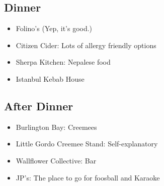 \subsection{Dinner}

\begin{itemize}
    \item Folino's (Yep, it's good.)
    \item Citizen Cider: Lots of allergy friendly options
    \item Sherpa Kitchen: Nepalese food
    \item Istanbul Kebab House
\end{itemize}

\subsection{After Dinner}

\begin{itemize}
    \item Burlington Bay: Creemees
    \item Little Gordo Creemee Stand: Self-explanatory
    \item Wallflower Collective: Bar
    \item JP's: The place to go for foosball and Karaoke
\end{itemize}
